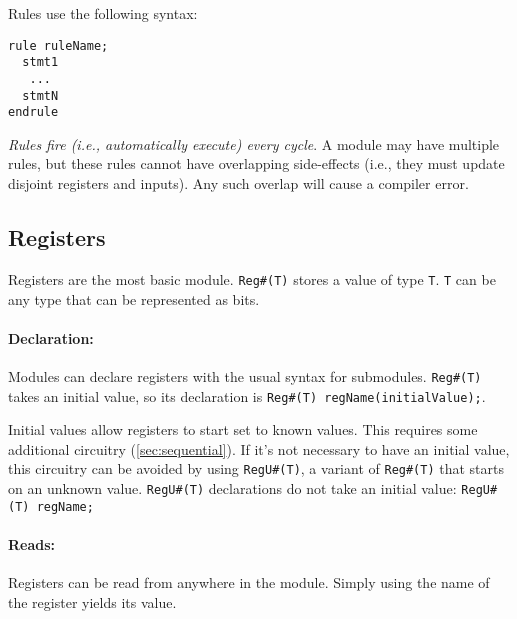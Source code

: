 Rules use the following syntax:
\begin{center}
  \verb|rule ruleName;| \\
  \verb|  stmt1       | \\
  \verb|   ...        | \\
  \verb|  stmtN       | \\
  \verb|endrule       |
\end{center}

\emph{Rules fire (i.e., automatically execute) every cycle}. A module may have multiple rules,
but these rules cannot have overlapping side-effects
(i.e., they must update disjoint registers and inputs).
Any such overlap will cause a compiler error.


\subsection{Registers}
\label{sec:registers}

Registers are the most basic module.
\verb|Reg#(T)| stores a value of type \verb|T|.
\verb|T| can be any type that can be represented as bits.

\paragraph{Declaration:}
Modules can declare registers with the usual syntax for submodules.
\verb|Reg#(T)| takes an initial value, so its declaration
is \verb|Reg#(T) regName(initialValue);|.

Initial values allow registers to start set to known values.
This requires some additional circuitry (\autoref{sec:sequential}).
If it's not necessary to have an initial value, this circuitry can be avoided by using
\verb|RegU#(T)|, a variant of \verb|Reg#(T)| that starts on an unknown value.
\verb|RegU#(T)| declarations do not take an initial value: \verb|RegU#(T) regName;|

\paragraph{Reads:}
Registers can be read from anywhere in the module.
Simply using the name of the register yields its value.

